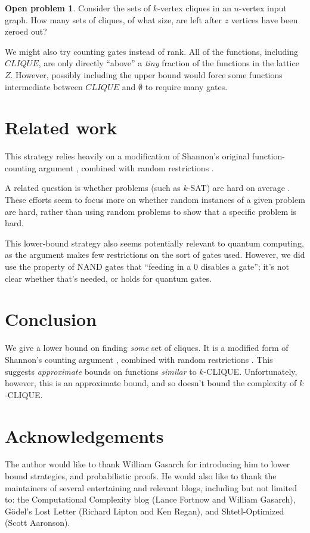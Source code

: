 \documentclass[12pt]{article}
\theoremstyle{definition}
\newtheorem{prob}{Open problem}[section]
\begin{document}
\begin{prob}
\label{vertexZonkingCount}
Consider the sets of $k$-vertex cliques in an $n$-vertex input graph.
How many sets of cliques, of what size,
are left after $z$ vertices have been zeroed out?
\end{prob}

We might also try counting gates instead of rank.
All of the functions, including $CLIQUE$, are only directly
``above'' a {\em tiny} fraction of the functions
in the lattice $Z$. However, possibly including the upper bound would force some
functions intermediate between $CLIQUE$ and $\emptyset$ to require many gates.

\section{Related work}

This strategy relies heavily on a modification of Shannon's original
function-counting argument \cite{shannon_synthesis_1949},
combined with random restrictions
\cite{subbotovskaya1963comparison}\cite{hastad1987lower}.

A related question is whether problems
(such as $k$-SAT) are
hard on average \cite{bogdanov2006average}.
These efforts seem to focus more on whether
random
instances of a given problem are hard, rather
than using random problems to show that
a specific problem is hard.

This lower-bound strategy also seems potentially
relevant to quantum computing,
as the argument makes few restrictions on the sort of gates used.
However, we did use the property of NAND gates that ``feeding in
a 0 disables a gate''; it's not clear whether that's needed,
or holds for quantum gates.

\section{Conclusion}

We give a lower bound on finding {\em some} set of cliques.
It is a modified form of Shannon's counting argument
\cite{shannon_synthesis_1949}, combined with random restrictions
\cite{subbotovskaya1963comparison} \cite{hastad1987lower}.
This suggests {\em approximate} bounds on functions {\em similar} to $k$-CLIQUE.
Unfortunately, however, this is an approximate bound,
and so doesn't bound the complexity of $k$-CLIQUE.

\section{Acknowledgements}

The author would like to thank William Gasarch for introducing him
to lower bound strategies, and probabilistic proofs.
He would also like to thank the maintainers of
several entertaining and relevant blogs, including but
not limited to: the Computational Complexity blog
(Lance Fortnow and William Gasarch), 
G\"odel's Lost Letter (Richard Lipton and Ken Regan),
and Shtetl-Optimized (Scott Aaronson). 



\end{document}
